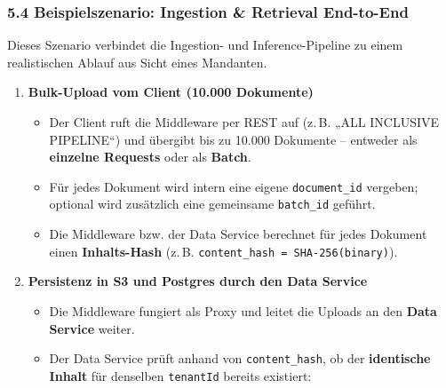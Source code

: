 \subsubsection{5.4 Beispielszenario: Ingestion \& Retrieval
End-to-End}\label{beispielszenario-ingestion-retrieval-end-to-end}

Dieses Szenario verbindet die Ingestion- und Inference-Pipeline zu einem
realistischen Ablauf aus Sicht eines Mandanten.

\begin{enumerate}
\def\labelenumi{\arabic{enumi}.}
\tightlist
\item
  \textbf{Bulk-Upload vom Client (10.000 Dokumente)}

  \begin{itemize}
  \tightlist
  \item
    Der Client ruft die Middleware per REST auf (z.\,B. „ALL INCLUSIVE
    PIPELINE``) und übergibt bis zu 10.000 Dokumente -- entweder als
    \textbf{einzelne Requests} oder als \textbf{Batch}.\\
  \item
    Für jedes Dokument wird intern eine eigene \texttt{document\_id}
    vergeben; optional wird zusätzlich eine gemeinsame
    \texttt{batch\_id} geführt.
  \item
    Die Middleware bzw. der Data Service berechnet für jedes Dokument
    einen \textbf{Inhalts-Hash} (z.\,B.
    \texttt{content\_hash\ =\ SHA-256(binary)}).
  \end{itemize}
\item
  \textbf{Persistenz in S3 und Postgres durch den Data Service}

  \begin{itemize}
  \tightlist
  \item
    Die Middleware fungiert als Proxy und leitet die Uploads an den
    \textbf{Data Service} weiter.\\
  \item
    Der Data Service prüft anhand von \texttt{content\_hash}, ob der
    \textbf{identische Inhalt} für denselben \texttt{tenantId} bereits
    existiert:


\end{itemize}
\end{enumerate}
